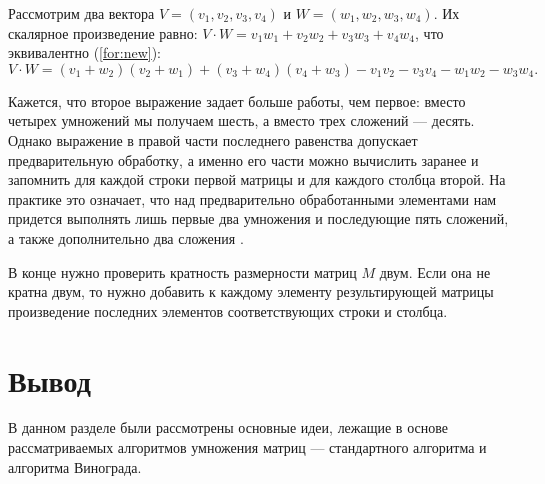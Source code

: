 Рассмотрим два вектора $V = (v_1, v_2, v_3, v_4)$ и $W = (w_1, w_2, w_3, w_4)$.
Их скалярное произведение равно: $V \cdot W = v_1w_1 + v_2w_2 + v_3w_3 + v_4w_4$, что эквивалентно (\ref{for:new}):
\begin{equation}
	\label{for:new}
	V \cdot W = (v_1 + w_2)(v_2 + w_1) + (v_3 + w_4)(v_4 + w_3) - v_1v_2 - v_3v_4 - w_1w_2 - w_3w_4.
\end{equation}

Кажется, что второе выражение задает больше работы, чем первое: вместо четырех умножений мы получаем шесть, а вместо трех сложений --- десять. Однако выражение в правой части последнего равенства допускает предварительную обработку, а именно его части можно вычислить заранее и запомнить для каждой строки первой матрицы и для каждого столбца второй. На практике это означает, что над предварительно обработанными элементами нам придется выполнять лишь первые два умножения и последующие пять сложений, а также дополнительно два сложения \cite{vinograd}.

В конце нужно проверить кратность размерности матриц $M$ двум. Если она не кратна двум, то нужно добавить к каждому элементу результирующей матрицы произведение последних элементов соответствующих строки и столбца.


\section*{Вывод}
В данном разделе были рассмотрены основные идеи, лежащие в основе рассматриваемых алгоритмов умножения матриц --- стандартного алгоритма и алгоритма Винограда.